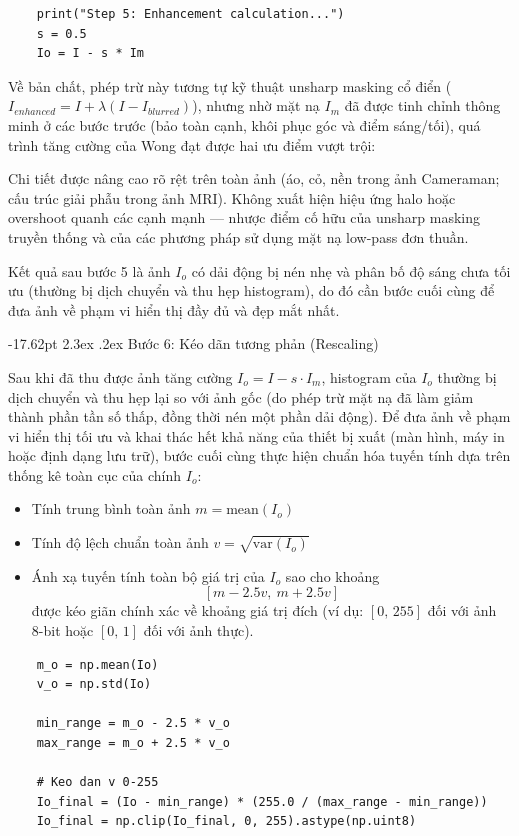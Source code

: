 \documentclass[a4paper]{report}
\makeatletter
\renewcommand\section{\@startsection{section}{1}{\z@}%
    {-17.62pt \@plus -5.89pt \@minus -1.18pt}%
    {2.3ex \@plus .2ex}%
    {\normalfont\fontsize{14.95pt}{16.31pt}\selectfont\bfseries}}%
\makeatother
\begin{document}
\begin{lstlisting}
    print("Step 5: Enhancement calculation...")
    s = 0.5
    Io = I - s * Im
\end{lstlisting}

Về bản chất, phép trừ này tương tự kỹ thuật unsharp masking cổ điển ($I_{enhanced} =
I + \lambda(I - I_{blurred})$), nhưng nhờ mặt nạ $I_m$ đã được tinh chỉnh thông minh ở các bước
trước (bảo toàn cạnh, khôi phục góc và điểm sáng/tối), quá trình tăng cường của
Wong đạt được hai ưu điểm vượt trội:

Chi tiết được nâng cao rõ rệt trên toàn ảnh (áo, cỏ, nền trong ảnh Cameraman;
cấu trúc giải phẫu trong ảnh MRI). Không xuất hiện hiệu ứng halo hoặc overshoot
quanh các cạnh mạnh --- nhược điểm cố hữu của unsharp masking truyền thống
và của các phương pháp sử dụng mặt nạ low-pass đơn thuần.

Kết quả sau bước 5 là ảnh $I_o$ có dải động bị nén nhẹ và phân bố độ sáng chưa tối
ưu (thường bị dịch chuyển và thu hẹp histogram), do đó cần bước cuối cùng để
đưa ảnh về phạm vi hiển thị đầy đủ và đẹp mắt nhất.

\section{Bước 6: Kéo dãn tương phản (Rescaling)}

Sau khi đã thu được ảnh tăng cường $I_o = I - s \cdot I_m$, histogram của $I_o$ thường bị dịch
chuyển và thu hẹp lại so với ảnh gốc (do phép trừ mặt nạ đã làm giảm thành phần
tần số thấp, đồng thời nén một phần dải động). Để đưa ảnh về phạm vi hiển thị
tối ưu và khai thác hết khả năng của thiết bị xuất (màn hình, máy in hoặc định
dạng lưu trữ), bước cuối cùng thực hiện chuẩn hóa tuyến tính dựa trên thống kê
toàn cục của chính $I_o$:

\begin{itemize}
    \item Tính trung bình toàn ảnh $m = \mathrm{mean}(I_o)$
    \item Tính độ lệch chuẩn toàn ảnh $v = \sqrt{\mathrm{var}(I_o)}$
    \item Ánh xạ tuyến tính toàn bộ giá trị của $I_o$ sao cho khoảng
          \[
              [m - 2.5v,\ m + 2.5v]
          \]
          được kéo giãn chính xác về khoảng giá trị đích (ví dụ: $[0,\,255]$ đối với ảnh 8-bit
          hoặc $[0,\,1]$ đối với ảnh thực).
\end{itemize}

\begin{lstlisting}
    m_o = np.mean(Io)
    v_o = np.std(Io)

    min_range = m_o - 2.5 * v_o
    max_range = m_o + 2.5 * v_o

    # Keo dan v 0-255
    Io_final = (Io - min_range) * (255.0 / (max_range - min_range))
    Io_final = np.clip(Io_final, 0, 255).astype(np.uint8)
\end{lstlisting}
\end{document}
